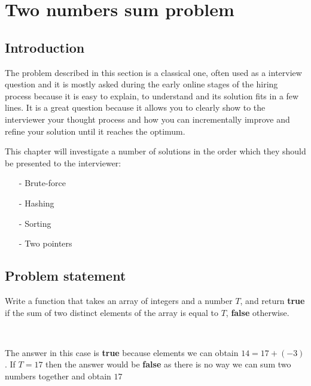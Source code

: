 %


\chapter{Two numbers sum problem}
\label{ch:two_numbers_sum}
\section*{Introduction}
The problem described in this section is a classical one, often used as a interview question and it is mostly asked during the early online stages of the hiring process because it is easy to explain, to understand and its solution fits in a few lines. It is a great question because it allows you to clearly show to the interviewer your thought process and how you can incrementally improve and refine your solution until it reaches the optimum.

This chapter will investigate a number of solutions in the order which they should be presented to the interviewer:
\begin{itemize}
	\item[-] Brute-force
	\item[-] Hashing
	\item[-] Sorting	
	\item[-] Two pointers
\end{itemize}

\section{Problem statement}

\begin{exercise}
Write a function that takes an array of integers and a number $T$, and return \textbf{true} if the sum of two distinct elements of the array is equal to $T$, \textbf{false} otherwise.
\end{exercise}


\begin{example}
\\ \hfill
	\begin{itemize}
		\item[-] 	$A=\{9, 4, 17, 42, 36, -3 ,15}\}$
		\item[-] 	$T = 14$
	\end{itemize}
The answer in this case is \textbf{true} because elements we can obtain $14=17+ (-3)$. 
If $T=17$ then the answer would be \textbf{false} as there is no way we can sum two numbers together and obtain $17$
\end{example}

